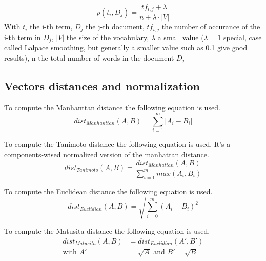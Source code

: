\begin{definition}
  \label{def:lidstone_smoothing}
  \begin{equation}
    p(t_i, D_j) = \frac{tf_{i,j} + \lambda}{n + \lambda \cdot |V|}
  \end{equation}
  With $t_i$ the i-th term, $D_j$ the j-th document, $tf_{i,j}$ the number of occurance of the i-th term in $D_j$, $|V|$ the size of the vocabulary, $\lambda$ a small value ($\lambda = 1$ special, case called Lalpace smoothing, but generally a smaller value such as 0.1 give good results), n the total number of words in the document $D_j$
\end{definition}

\subsection{Vectors distances and normalization}

\begin{definition}
  To compute the Manhanttan distance the following equation is used.
  \begin{equation}
    dist_{Manhanttan}(A, B) = \sum_{i=1}^{m} |A_i - B_i|
  \end{equation}
\end{definition}

\begin{definition}
  To compute the Tanimoto distance the following equation is used. It's a components-wised normalized version of the manhattan distance.
  \begin{equation}
    dist_{Tanimoto}(A, B) = \frac{dist_{Manhattan}(A, B)}{\sum_{i=1}^{m} max(A_i, B_i)}
  \end{equation}
\end{definition}

\begin{definition}
  To compute the Euclidean distance the following equation is used.
  \begin{equation}
    dist_{Euclidian}(A, B) = \sqrt{\sum_{i=0}^{m}(A_i - B_i)^2}
  \end{equation}
\end{definition}

\begin{definition}
  To compute the Matusita distance the following equation is used.
  \begin{equation}
    \begin{split}
      dist_{Matusita}(A, B) &= dist_{Euclidian}(A', B') \\
      \text{with }A' &= \sqrt{A}\text{ and }B' = \sqrt{B}
    \end{split}
  \end{equation}
\end{definition}

